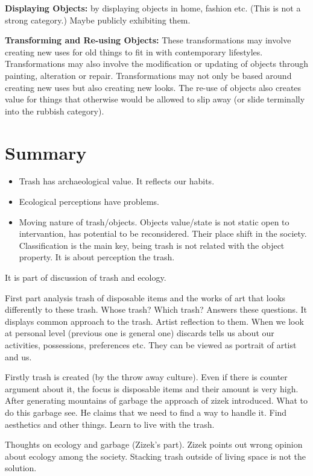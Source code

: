 \textbf{Displaying Objects:} by displaying objects in home, fashion etc. (This is not a strong category.) Maybe publicly exhibiting them. 

\textbf{Transforming and Re-using Objects:} These transformations may involve creating new uses for old things to fit in with contemporary lifestyles. Transformations may also involve the modification or updating of objects through painting, alteration or repair. Transformations may not only be based around creating new uses but also creating new looks. The re-use of objects also creates value for things that otherwise would be allowed to slip away (or slide terminally into the rubbish category).





%
%
\section{Summary}
\begin{itemize}
\item Trash has archaeological value. It reflects our habits.
\item Ecological perceptions have problems. 
\item Moving nature of trash/objects. Objects value/state is not static open to intervantion, has potential to be reconsidered. Their place shift in the society. Classification is the main key, being trash is not related with the object property. It is about perception the trash.
\end{itemize}

It is part of discussion of trash and ecology.

First part analysis trash of disposable items and the works of art that looks differently to these trash. Whose trash? Which trash? Answers these questions. It displays common approach to the trash. Artist reflection to them. When we look at personal level (previous one is general one) discards tells us about our activities, possessions, preferences etc. They can be viewed as portrait of artist and us.

Firstly trash is created (by the throw away culture). Even if there is counter argument about it, the focus is disposable items and their amount is very high. After generating mountains of garbage the approach of zizek introduced. What to do this garbage see. He claims that we need to find a way to handle it. Find aesthetics and other things. Learn to live with the trash.

Thoughts on ecology and garbage (Zizek's part). Zizek points out wrong opinion about ecology among the society. Stacking trash outside of living space is not the solution.

